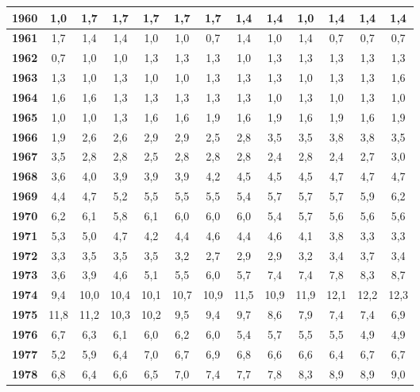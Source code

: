 \begin{center}
\begin{footnotesize}
\begin{longtable}{|c|c|c|c|c|c|c|c|c|c|c|c|c|}
\hline 
\textbf{1960} & 1,0 & 1,7 & 1,7 & 1,7 & 1,7 & 1,7 & 1,4 & 1,4 & 1,0 & 1,4 & 1,4 & 1,4  \\ 
\hline 
\textbf{1961} & 1,7 & 1,4 & 1,4 & 1,0 & 1,0 & 0,7 & 1,4 & 1,0 & 1,4 & 0,7 & 0,7 & 0,7  \\ 
\hline 
\textbf{1962} & 0,7 & 1,0 & 1,0 & 1,3 & 1,3 & 1,3 & 1,0 & 1,3 & 1,3 & 1,3 & 1,3 & 1,3  \\ 
\hline 
\textbf{1963} & 1,3 & 1,0 & 1,3 & 1,0 & 1,0 & 1,3 & 1,3 & 1,3 & 1,0 & 1,3 & 1,3 & 1,6  \\ 
\hline 
\textbf{1964} & 1,6 & 1,6 & 1,3 & 1,3 & 1,3 & 1,3 & 1,3 & 1,0 & 1,3 & 1,0 & 1,3 & 1,0  \\ 
\hline 
\textbf{1965} & 1,0 & 1,0 & 1,3 & 1,6 & 1,6 & 1,9 & 1,6 & 1,9 & 1,6 & 1,9 & 1,6 & 1,9  \\ 
\hline 
\textbf{1966} & 1,9 & 2,6 & 2,6 & 2,9 & 2,9 & 2,5 & 2,8 & 3,5 & 3,5 & 3,8 & 3,8 & 3,5  \\ 
\hline 
\textbf{1967} & 3,5 & 2,8 & 2,8 & 2,5 & 2,8 & 2,8 & 2,8 & 2,4 & 2,8 & 2,4 & 2,7 & 3,0  \\ 
\hline 
\textbf{1968} & 3,6 & 4,0 & 3,9 & 3,9 & 3,9 & 4,2 & 4,5 & 4,5 & 4,5 & 4,7 & 4,7 & 4,7  \\ 
\hline 
\textbf{1969} & 4,4 & 4,7 & 5,2 & 5,5 & 5,5 & 5,5 & 5,4 & 5,7 & 5,7 & 5,7 & 5,9 & 6,2  \\ 
\hline 
\textbf{1970} & 6,2 & 6,1 & 5,8 & 6,1 & 6,0 & 6,0 & 6,0 & 5,4 & 5,7 & 5,6 & 5,6 & 5,6  \\ 
\hline 
\textbf{1971} & 5,3 & 5,0 & 4,7 & 4,2 & 4,4 & 4,6 & 4,4 & 4,6 & 4,1 & 3,8 & 3,3 & 3,3  \\ 
\hline 
\textbf{1972} & 3,3 & 3,5 & 3,5 & 3,5 & 3,2 & 2,7 & 2,9 & 2,9 & 3,2 & 3,4 & 3,7 & 3,4  \\ 
\hline 
\textbf{1973} & 3,6 & 3,9 & 4,6 & 5,1 & 5,5 & 6,0 & 5,7 & 7,4 & 7,4 & 7,8 & 8,3 & 8,7  \\ 
\hline 
\textbf{1974} & 9,4 & 10,0 & 10,4 & 10,1 & 10,7 & 10,9 & 11,5 & 10,9 & 11,9 & 12,1 & 12,2 & 12,3  \\ 
\hline 
\textbf{1975} & 11,8 & 11,2 & 10,3 & 10,2 & 9,5 & 9,4 & 9,7 & 8,6 & 7,9 & 7,4 & 7,4 & 6,9  \\ 
\hline 
\textbf{1976} & 6,7 & 6,3 & 6,1 & 6,0 & 6,2 & 6,0 & 5,4 & 5,7 & 5,5 & 5,5 & 4,9 & 4,9  \\ 
\hline 
\textbf{1977} & 5,2 & 5,9 & 6,4 & 7,0 & 6,7 & 6,9 & 6,8 & 6,6 & 6,6 & 6,4 & 6,7 & 6,7  \\ 
\hline 
\textbf{1978} & 6,8 & 6,4 & 6,6 & 6,5 & 7,0 & 7,4 & 7,7 & 7,8 & 8,3 & 8,9 & 8,9 & 9,0  \\ 

\end{longtable}
\end{footnotesize}
\end{center}
